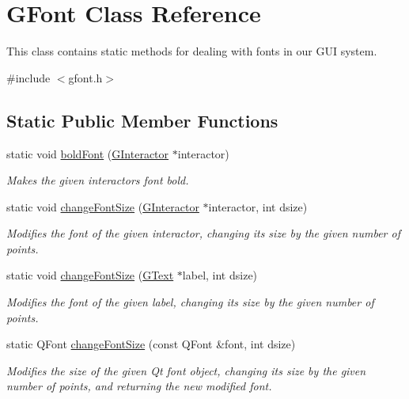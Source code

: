 \hypertarget{classsgl_1_1GFont}{}\section{G\+Font Class Reference}
\label{classsgl_1_1GFont}


This class contains static methods for dealing with fonts in our G\+UI system.  




{\ttfamily \#include $<$gfont.\+h$>$}

\subsection*{Static Public Member Functions}
\begin{DoxyCompactItemize}
\item 
static void \mbox{\hyperlink{classsgl_1_1GFont_ae709c4560c613217490269d4df94602c}{bold\+Font}} (\mbox{\hyperlink{classsgl_1_1GInteractor}{G\+Interactor}} $\ast$interactor)
\begin{DoxyCompactList}\small\item\em Makes the given interactor\textquotesingle{}s font bold. \end{DoxyCompactList}\item 
static void \mbox{\hyperlink{classsgl_1_1GFont_ae6714d087455b3431d6dce6f1202659f}{change\+Font\+Size}} (\mbox{\hyperlink{classsgl_1_1GInteractor}{G\+Interactor}} $\ast$interactor, int dsize)
\begin{DoxyCompactList}\small\item\em Modifies the font of the given interactor, changing its size by the given number of points. \end{DoxyCompactList}\item 
static void \mbox{\hyperlink{classsgl_1_1GFont_a8efb627bfbb3c5dddb8453dd8668880a}{change\+Font\+Size}} (\mbox{\hyperlink{classsgl_1_1GText}{G\+Text}} $\ast$label, int dsize)
\begin{DoxyCompactList}\small\item\em Modifies the font of the given label, changing its size by the given number of points. \end{DoxyCompactList}\item 
static Q\+Font \mbox{\hyperlink{classsgl_1_1GFont_a1f55c64940d99e62528d5bfc634123f8}{change\+Font\+Size}} (const Q\+Font \&font, int dsize)
\begin{DoxyCompactList}\small\item\em Modifies the size of the given Qt font object, changing its size by the given number of points, and returning the new modified font. \end{DoxyCompactList}\item 

\end{DoxyCompactItemize}
